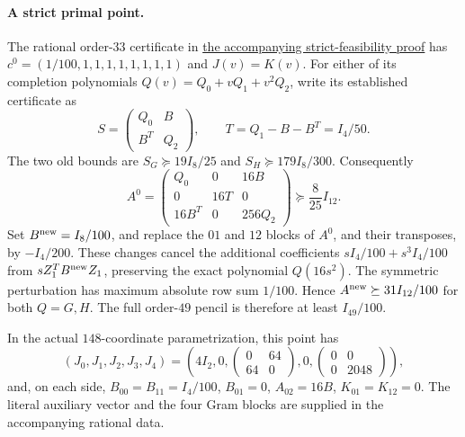\paragraph{A strict primal point.}
The rational order-$33$ certificate in
\href{https://github.com/anubhav70747/q222-finite-sdp/blob/main/extracted-lifts/canonical-completion/full-polar/slater_proof.txt}{the accompanying strict-feasibility proof} has
$c^0=(1/100,1,1,1,1,1,1,1,1)$ and $J(v)=K(v)$.
For either of its completion polynomials $Q(v)=Q_0+vQ_1+v^2Q_2$,
write its established certificate as
\[
 S=\begin{pmatrix}Q_0&B\\B^T&Q_2\end{pmatrix},\qquad
 T=Q_1-B-B^T=I_4/50.
\]
The two old bounds are $S_G\succeq19I_8/25$ and
$S_H\succeq179I_8/300$. Consequently
\[
 A^0=\begin{pmatrix}
 Q_0&0&16B\\0&16T&0\\16B^T&0&256Q_2
 \end{pmatrix}\succeq\frac8{25}I_{12}.
\]
Set $B^{\rm new}=I_8/100$, and replace the $01$ and $12$ blocks of
$A^0$, and their transposes, by $-I_4/200$. These changes cancel
the additional coefficients $sI_4/100+s^3I_4/100$ from
$sZ_1^TB^{\rm new}Z_1$, preserving the exact polynomial $Q(16s^2)$.
The symmetric perturbation has maximum absolute row sum $1/100$.
Hence $A^{\rm new}\succeq31I_{12}/100$ for both $Q=G,H$.
The full order-$49$ pencil is therefore at least $I_{49}/100$.

In the actual $148$-coordinate parametrization, this point has
\[
 (J_0,J_1,J_2,J_3,J_4)=
 \left(4I_2,0,
       \begin{pmatrix}0&64\\64&0\end{pmatrix},0,
       \begin{pmatrix}0&0\\0&2048\end{pmatrix}\right),
\]
and, on each side,
$B_{00}=B_{11}=I_4/100$, $B_{01}=0$, $A_{02}=16B$,
$K_{01}=K_{12}=0$. The literal auxiliary vector and the four Gram
blocks are supplied in the accompanying rational data.
